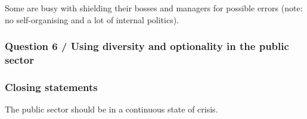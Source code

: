 Some are busy with shielding their bosses and managers for possible errors (note: no self-organising and a lot of internal politics). 

\subsubsection{Question 6 / Using diversity and optionality in the public sector}

\subsubsection{Closing statements}


The public sector should be in a continuous state of crisis.

